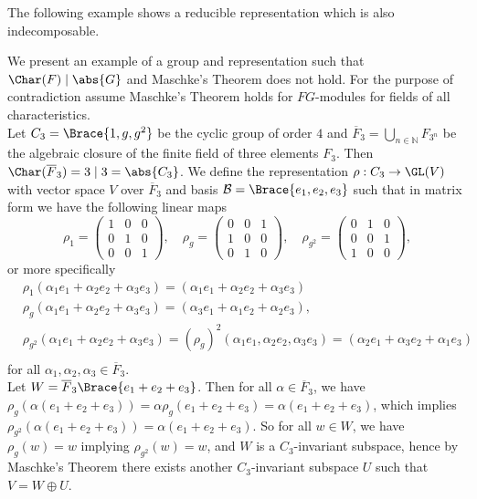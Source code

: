 \documentclass[../Project.tex]{subfiles}
\begin{document}
The following example shows a reducible representation which is also indecomposable.

\begin{exam}
	\label{meh10}
	We present an example of a group and representation such that $\Char(F) \mid \abs{G}$ and Maschke's Theorem does not hold. For the purpose of contradiction assume Maschke's Theorem holds for $FG$-modules for fields of all characteristics.\\

	Let $C_3 = \Brace{1, g, g^2}$ be the cyclic group of order $4$ and $\overline{F}_3 = \bigcup\limits_{n \in \mathbb{N}}F_{3^n}$ be the algebraic closure of the finite field of three elements $F_3$. Then $\Char(\overline{F}_3) = 3\mid 3 = \abs{C_3}$.
	We define the representation $\rho : C_3 \to \GL(V)$ with vector space $V$ over $\overline{F}_3$ and basis $\mathcal{B} = \Brace{e_1,e_2,e_3}$ such that in matrix form we have the following linear maps
	$$\rho_1 = \begin{pmatrix}1 & 0 & 0\\0 & 1 & 0 \\0 & 0 & 1\end{pmatrix},\quad \rho_g = \begin{pmatrix}0 & 0 & 1\\1 & 0 & 0\\0 & 1 & 0\end{pmatrix},\quad \rho_{g^2} = \begin{pmatrix}0 & 1 & 0\\0 & 0 & 1\\1 & 0 & 0\end{pmatrix},$$
	or more specifically
	\begin{align*}
	&\rho_1(\alpha_1e_1 + \alpha_2e_2 + \alpha_3e_3) = (\alpha_1e_1+\alpha_2e_2 + \alpha_3e_3)\\
	&\rho_g(\alpha_1e_1+\alpha_2e_2+\alpha_3e_3) = (\alpha_3e_1+\alpha_1e_2+\alpha_2e_3),\\
	&\rho_{g^2}(\alpha_1e_1 + \alpha_2e_2 + \alpha_3e_3) = (\rho_g)^2(\alpha_1e_1,\alpha_2e_2,\alpha_3e_3) = (\alpha_2e_1 + \alpha_3e_2 + \alpha_1e_3)\\
	\end{align*}
	for all $\alpha_1,\alpha_2,\alpha_3 \in \overline{F}_3$.\\

	Let $W = \overline{F}_3\Brace{e_1+e_2+e_3}$. Then for all $\alpha \in \overline{F}_3$, we have $\rho_g(\alpha(e_1 + e_2 + e_3)) = \alpha\rho_g(e_1 + e_2 + e_3) = \alpha(e_1 + e_2 + e_3)$, which implies $\rho_{g^2}(\alpha(e_1 + e_2 + e_3)) = \alpha(e_1 + e_2 + e_3)$. So for all $w \in W$, we have $\rho_g(w) = w$ implying $\rho_{g^2}(w) = w$, and $W$ is a $C_3$-invariant subspace, hence by Maschke's Theorem there exists another $C_3$-invariant subspace $U$ such that $V = W \oplus U$.\\


\end{exam}
\end{document}
